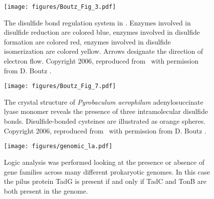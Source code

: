 \begin{figure}[p] \texttt{[image: figures/Boutz\_Fig\_3.pdf]}

\caption[The disulfide bond regulation system in \ecoli]{The disulfide bond
regulation system in \ecoli.  Enzymes involved in disulfide reduction are
colored blue, enzymes involved in disulfide formation are colored red, enzymes
involved in disulfide isomerization are colored yellow.  Arrows designate the
direction of electron flow.  Copyright 2006, reproduced from \emph{\dbthesis}\
with permission from D. Boutz \cite{boutz_thesis}. }

\label{Boutz_Fig_3}

\end{figure}

\begin{figure}[p] \texttt{[image: figures/Boutz\_Fig\_7.pdf]}

\caption[The crystal structure of \emph{Pyrobaculum aerophilum}
adenylosuccinate lyase monomer reveals the presence of three intramolecular
disulfide bonds]{The crystal structure of \emph{Pyrobaculum aerophilum}
adenylosuccinate lyase monomer reveals the presence of three intramolecular
disulfide bonds.  Disulfide-bonded cysteines are illustrated as orange spheres.
Copyright 2006, reproduced from \emph{\dbthesis}\ with permission from D. Boutz
\cite{boutz_thesis}.}

\label{Boutz_Fig_7} 

\end{figure}


\clearpage

% 
% 
% 


\begin{figure}[p] \texttt{[image: figures/genomic\_la.pdf]}

\caption[Logic analysis of genes in prokaryotic genomes.]{ Logic analysis was
performed looking at the presence or absence of gene families across many
different prokaryotic genomes.  In this case the pilus protein TadG is present
if and only if TadC and TonB are both present in the genome.}

\label{phylo_la}
\end{figure}


